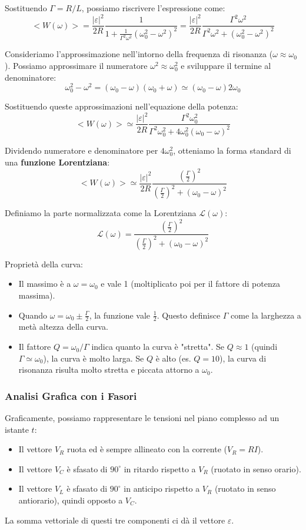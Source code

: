 \documentclass{book}
\begin{document}
Sostituendo $\Gamma = R/L$, possiamo riscrivere l'espressione come:
$$
<W(\omega)> = \frac{|\varepsilon|^2}{2R} \frac{1}{1+ \frac{1}{\Gamma^2 \omega^2} (\omega_0^2 - \omega^2)^2} = \frac{|\varepsilon|^2}{2R} \frac{\Gamma^2 \omega^2}{\Gamma^2 \omega^2 +(\omega_0^2-\omega^2)^2}
$$

Consideriamo l'approssimazione nell'intorno della frequenza di risonanza ($\omega \approx \omega_0$). Possiamo approssimare il numeratore $\omega^2 \approx \omega_0^2$ e sviluppare il termine al denominatore:
$$
\omega_0^2 - \omega^2 = (\omega_0 - \omega) (\omega_0 + \omega ) \simeq (\omega_0- \omega) 2 \omega_0
$$

Sostituendo queste approssimazioni nell'equazione della potenza:
$$
<W(\omega)> \simeq \frac{|\varepsilon|^2}{2R} \frac{\Gamma^2 \omega_0^2}{\Gamma^2 \omega_0^2 + 4 \omega_0^2 (\omega_0-\omega)^2}
$$

Dividendo numeratore e denominatore per $4\omega_0^2$, otteniamo la forma standard di una \textbf{funzione Lorentziana}:
$$
<W(\omega)> \simeq \frac{|\varepsilon|^2}{2R} \frac{\left(\frac{\Gamma}{2}\right)^2}{\left(\frac{\Gamma}{2}\right)^2 + (\omega_0 - \omega)^2}
$$

Definiamo la parte normalizzata come la Lorentziana $\mathcal{L}(\omega)$:
$$
\mathcal{L}(\omega)= \frac{\left(\frac{\Gamma}{2}\right)^2}{\left(\frac{\Gamma}{2}\right)^2 +(\omega_0 - \omega)^2}
$$

Proprietà della curva:
\begin{itemize}
    \item Il massimo è a $\omega = \omega_0$ e vale 1 (moltiplicato poi per il fattore di potenza massima).
    \item Quando $\omega = \omega_0 \pm \frac{\Gamma}{2}$, la funzione vale $\frac{1}{2}$. Questo definisce $\Gamma$ come la larghezza a metà altezza della curva.
    \item Il fattore $Q = \omega_0 / \Gamma$ indica quanto la curva è "stretta". Se $Q \approx 1$ (quindi $\Gamma \simeq \omega_0$), la curva è molto larga. Se $Q$ è alto (es. $Q=10$), la curva di risonanza risulta molto stretta e piccata attorno a $\omega_0$.
\end{itemize}

\subsubsection*{Analisi Grafica con i Fasori}

Graficamente, possiamo rappresentare le tensioni nel piano complesso ad un istante $t$:
\begin{itemize}
    \item Il vettore $V_R$ ruota ed è sempre allineato con la corrente ($V_R = RI$).
    \item Il vettore $V_C$ è sfasato di $90^\circ$ in ritardo rispetto a $V_R$ (ruotato in senso orario).
    \item Il vettore $V_L$ è sfasato di $90^\circ$ in anticipo rispetto a $V_R$ (ruotato in senso antiorario), quindi opposto a $V_C$.
\end{itemize}
La somma vettoriale di questi tre componenti ci dà il vettore $\varepsilon$.
\end{document}
